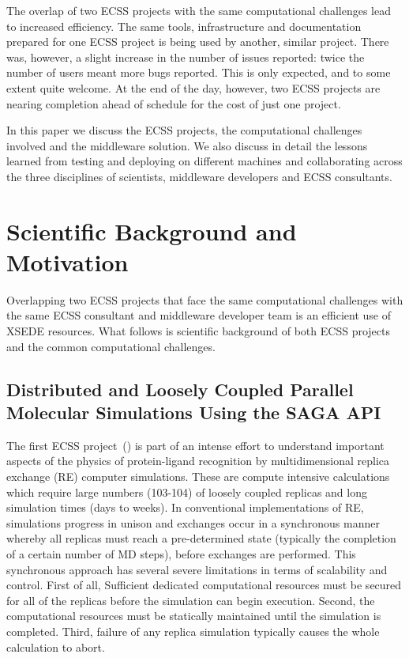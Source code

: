 \documentclass{sig-alternate}
\begin{document}
The overlap of two ECSS projects with the same computational challenges lead to
increased efficiency. The same tools, infrastructure and documentation prepared
for one ECSS project is being used by another, similar project. There was,
however, a slight increase in the number of issues reported: twice the number
of users meant more bugs reported. This is only expected, and to some extent
quite welcome. At the end of the day, however, two ECSS projects are nearing
completion ahead of schedule for the cost of just one project.

In this paper we discuss the ECSS projects, the computational challenges
involved and the middleware solution. We also discuss in detail the lessons
learned from testing and deploying on different machines and collaborating
across the three disciplines of scientists, middleware developers and ECSS
consultants.



\section{Scientific Background and Motivation}

Overlapping two ECSS projects that face the same computational challenges
with the same ECSS consultant and middleware developer team is an efficient
use of XSEDE resources. What follows is scientific background of both ECSS projects
and the common computational challenges.

\subsection{Distributed and Loosely Coupled Parallel Molecular Simulations
Using the SAGA API}
The first ECSS project~(\cite{RonLevy}) is part of an intense effort to
understand
important aspects of the physics of protein-ligand recognition by
multidimensional replica exchange (RE) computer simulations. These are
compute intensive calculations which require large numbers (103-104) of
loosely coupled replicas and long simulation times (days to weeks). In
conventional implementations of RE, simulations progress in unison and
exchanges occur in a synchronous manner whereby all replicas must
reach a pre-determined state (typically the completion of a certain
number of MD steps), before exchanges are performed. This synchronous
approach has several severe limitations in terms of scalability and
control. First of all, Sufficient dedicated computational resources must
be secured for all of the replicas before the simulation can begin
execution. Second, the computational resources must be statically
maintained until the simulation is completed. Third, failure of any
replica simulation typically causes the whole calculation to abort.
\end{document}
